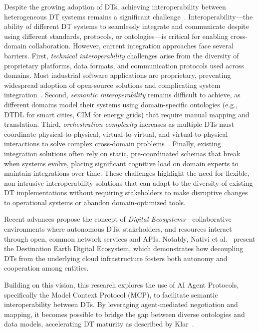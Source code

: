 Despite the growing adoption of DTs, achieving interoperability between heterogeneous DT systems remains a significant challenge~\cite{Tripathi_2024}.
Interoperability---the ability of different DT systems to seamlessly integrate and communicate despite using different standards, protocols, or ontologies---is critical for enabling cross-domain collaboration.
However, current integration approaches face several barriers.
First, \emph{technical interoperability} challenges arise from the diversity of proprietary platforms, data formats, and communication protocols used across domains.
Most industrial software applications are proprietary, preventing widespread adoption of open-source solutions and complicating system integration~\cite{Tripathi_2024}.
Second, \emph{semantic interoperability} remains difficult to achieve, as different domains model their systems using domain-specific ontologies (e.g., DTDL for smart cities, CIM for energy grids) that require manual mapping and translation.
Third, \emph{orchestration complexity} increases as multiple DTs must coordinate physical-to-physical, virtual-to-virtual, and virtual-to-physical interactions to solve complex cross-domain problems~\cite{Tripathi_2024}.
Finally, existing integration solutions often rely on static, pre-coordinated schemas that break when systems evolve, placing significant cognitive load on domain experts to maintain integrations over time.
These challenges highlight the need for flexible, non-intrusive interoperability solutions that can adapt to the diversity of existing DT implementations without requiring stakeholders to make disruptive changes to operational systems or abandon domain-optimized tools.


Recent advances propose the concept of \emph{Digital Ecosystems}---collaborative environments where autonomous DTs, stakeholders, and resources interact through open, common network services and APIs. Notably, Nativi et al.~\cite{nativi2022digital} present the Destination Earth Digital Ecosystem, which demonstrates how decoupling DTs from the underlying cloud infrastructure fosters both autonomy and cooperation among entities.


Building on this vision, this research explores the use of AI Agent Protocols, specifically the Model Context Protocol (MCP), to facilitate semantic interoperability between DTs. By leveraging agent-mediated negotiation and mapping, it becomes possible to bridge the gap between diverse ontologies and data models, accelerating DT maturity as described by Klar~\cite{klar2023digital}.


